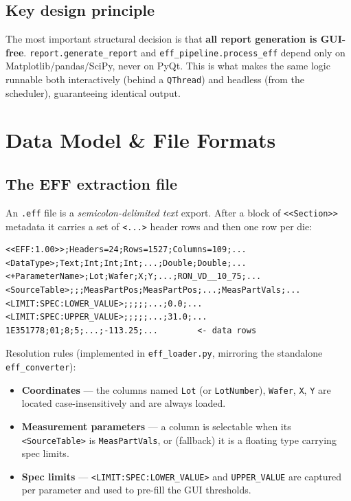 \documentclass[11pt,a4paper]{report}
\newcommand{\code}[1]{\texttt{#1}}
\begin{document}
\section{Key design principle}
The most important structural decision is that \textbf{all report generation is
GUI-free}. \code{report.generate\_report} and \code{eff\_pipeline.process\_eff}
depend only on Matplotlib/pandas/SciPy, never on PyQt. This is what makes the
same logic runnable both interactively (behind a \code{QThread}) and headless
(from the scheduler), guaranteeing identical output.

\chapter{Data Model \& File Formats}\label{ch:data}

\section{The EFF extraction file}
An \code{.eff} file is a \emph{semicolon-delimited text} export. After a block of
\code{<<Section>>} metadata it carries a set of \code{<...>} header rows and then
one row per die:

\begin{lstlisting}[style=plain]
<<EFF:1.00>>;Headers=24;Rows=1527;Columns=109;...
<DataType>;Text;Int;Int;Int;...;Double;Double;...
<+ParameterName>;Lot;Wafer;X;Y;...;RON_VD__10_75;...
<SourceTable>;;;MeasPartPos;MeasPartPos;...;MeasPartVals;...
<LIMIT:SPEC:LOWER_VALUE>;;;;;...;0.0;...
<LIMIT:SPEC:UPPER_VALUE>;;;;;...;31.0;...
1E351778;01;8;5;...;-113.25;...        <- data rows
\end{lstlisting}

\noindent Resolution rules (implemented in \code{eff\_loader.py}, mirroring the
standalone \code{eff\_converter}):
\begin{itemize}[leftmargin=1.4em]
  \item \textbf{Coordinates} — the columns named \code{Lot} (or \code{LotNumber}),
        \code{Wafer}, \code{X}, \code{Y} are located case-insensitively and are
        always loaded.
  \item \textbf{Measurement parameters} — a column is selectable when its
        \code{<SourceTable>} is \code{MeasPartVals}, or (fallback) it is a
        floating type carrying spec limits.
  \item \textbf{Spec limits} — \code{<LIMIT:SPEC:LOWER\_VALUE>} and
        \code{UPPER\_VALUE} are captured per parameter and used to pre-fill the
        GUI thresholds.
\end{itemize}
\end{document}
